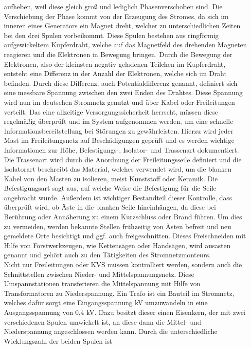 aufheben, weil diese gleich groß und lediglich Phasenverschoben sind. Die Verschiebung der Phase kommt von der Erzeugung des Stromes, da sich im inneren 
eines Generators ein Magnet dreht, welcher zu unterschiedlichen Zeiten bei den drei Spulen vorbeikommt. Diese Spulen bestehen aus ringförmig aufgewickeltem 
Kupferdraht, welche auf das Magnetfeld des drehenden Magneten reagieren und die Elektronen in Bewegung bringen. Durch die Bewegung der Elektronen, also der 
kleinsten negativ geladenen Teilchen im Kupferdraht, entsteht eine Differenz in der Anzahl der Elektronen, welche sich im Draht befinden. Durch diese 
Differenz, auch Potentialdifferenz genannt, definiert sich eine messbare Spannung zwischen den zwei Enden des Drahtes. Diese Spannung wird nun im deutschen 
Stromnetz genutzt und über Kabel oder Freileitungen verteilt. Das eine allzeitige Versorgungssicherheit herrscht, müssen diese regelmäßig überprüft und im 
System aufgenommen werden, um eine schnelle Informationsbereitstellung bei Störungen zu gewährleisten. Hierzu wird jeder Mast im Freileitungsnetz auf 
Beschädigungen geprüft und es werden wichtige Informationen zur Höhe, Befestigungs-, Isolator- und Trassenart dokumentiert. Die Trassenart wird durch die 
Anordnung der Freileitungsseile definiert und die Isolatorart beschreibt das Material, welches verwendet wird, um die blanken Kabel von den Masten zu 
isolieren, meist Kunststoff oder Keramik. Die Befestigungsart sagt aus, auf welche Weise die Befestigung für die Seile angebracht wurde. Außerdem ist 
wichtiger Bestandteil dieser Kontrolle, dass überprüft wird, ob Äste in die blanken Seile hineinhängen, da diese bei Berührung oder Annäherung zu einem 
Kurzschluss oder Brand führen. Um dies zu vermeiden, werden bekannte Stellen frühzeitig von Ästen befreit und neu gemeldete Orte besichtigt und ggf. auch 
freigeschnitten. Dieses Freischneiden mit Hilfe von Forstwerkzeugen, wie Kettensägen oder Handsägen, wird ausasten genannt und gehört auch zu den 
Tätigkeiten des Stromnetzmonteurs.\\
Nicht nur Freileitungen oder KVS müssen kontrolliert werden, sondern auch die Schnittstellen zwischen Nieder- und Mittelspannungsnetz. Diese Umspannstationen 
transferieren die Mittelspannung mit Hilfe von Transformatoren zu Niederspannung. Ein Trafo ist ein Bauteil im Stromnetz, welches dafür sorgt eine 
Eingangsspannung  kV umzuwandeln in eine Ausgangsspannung von 0,4 kV. Dazu besitzt dieser einen Eisenkern, der mit zwei verschiedenen Spulen 
umwickelt ist, an diese dann die Mittel- und Niederspannung angeschlossen werden kann. Durch die unterschiedliche Wicklungszahl der beiden Spulen ist 
